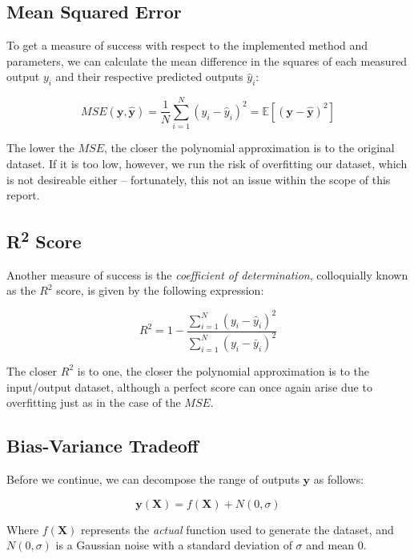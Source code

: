 \documentclass[a4paper,10pt,english]{article}
\begin{document}
\subsection{Mean Squared Error}

To get a measure of success with respect to the implemented method and parameters, we can calculate the mean difference in the squares of each measured output $y_i$ and their respective predicted outputs $\hat{y}_i$:

\begin{equation}
MSE(\mathbf{y}, \mathbf{\hat{y}}) = \frac{1}{N} \sum_{i=1}^{N} (y_i - \hat{y}_i)^2 = \mathbb{E}\left[(\mathbf{y}-\hat{\mathbf{y}})^{2}\right]
\end{equation}

The lower the $MSE$, the closer the polynomial approximation is to the original dataset.  If it is too low, however, we run the risk of overfitting our dataset, which is not desireable either – fortunately, this not an issue within the scope of this report.

\subsection{R\textsuperscript{2} Score}

Another measure of success is the \textit{coefficient of determination}, colloquially known as the $R^2$ score, is given by the following expression:

\begin{equation}
R^2 = 1 - \frac{\sum_{i=1}^N (y_i - \hat{y}_i)^2 }{\sum_{i=1}^N (y_i - \bar{y}_i)^2 }
\end{equation}

The closer $R^2$ is to one, the closer the polynomial approximation is to the input/output dataset, although a perfect score can once again arise due to overfitting just as in the case of the $MSE$.

\subsection{Bias-Variance Tradeoff}

Before we continue, we can decompose the range of outputs $\mathbf{y}$ as follows:

\begin{equation}
\label{eq_method_5}
\mathbf{y}(\mathbf{X}) = f(\mathbf{X}) + N(0, \sigma) 
\end{equation}

Where $f(\mathbf{X})$ represents the \textit{actual} function used to generate the dataset, and $N(0,\sigma)$ is a Gaussian noise with a standard deviation of $\sigma$ and mean 0.
\end{document}
